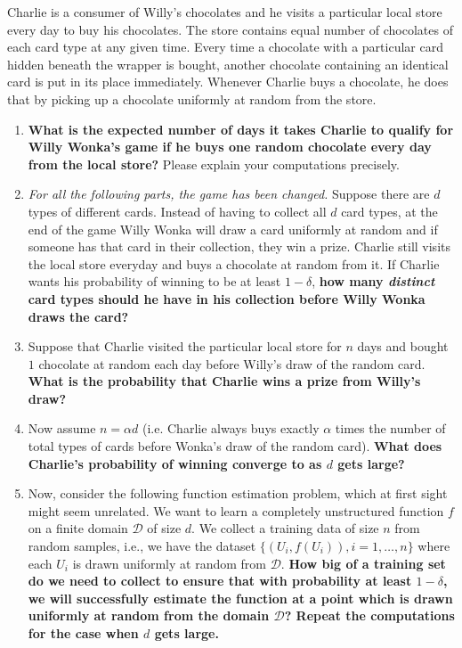 \documentclass{article}\usepackage[utf8]{inputenc}\usepackage[margin=0.4cm,top=0.4cm,bottom=0.4cm]{geometry}\usepackage[usenames,dvipsnames,svgnames,table]{xcolor}
\begin{document}
\noindent Charlie is a consumer of Willy's chocolates and he visits a particular local store every day to buy his chocolates. The store contains equal number of chocolates of each card type at any given time. Every time a chocolate with a particular card hidden beneath the wrapper is bought, another chocolate containing an identical card is put in its place immediately. Whenever Charlie buys a chocolate, he does that by picking up a chocolate uniformly at random from the store.
\begin{enumerate}
\item \textbf{What is the expected number of days it takes Charlie to qualify for Willy Wonka's game if he buys one random chocolate every day from the local store?} Please explain your computations precisely.
\BeginSolution

\EndSolution
\item \textit{For all the following parts, the game has been changed.} Suppose there are $d$ types of different cards. Instead of having to collect all $d$ card types, at the end of the game Willy Wonka will draw a card uniformly at random and if someone has that card in their collection, they win a prize. Charlie still visits the local store everyday and buys a chocolate at random from it. If Charlie wants his probability of winning to be at least $1-\delta$, \textbf{how many \textit{distinct} card types should he have in his collection before Willy Wonka draws the card?}
\BeginSolution

\EndSolution
\item Suppose that Charlie visited the particular local store for $n$ days and bought $1$ chocolate at random each day before Willy's draw of the random card. \textbf{What is the probability that Charlie wins a prize from Willy's draw?}
\BeginSolution

\EndSolution
\item Now assume $n = \alpha d$ (i.e. Charlie always buys exactly $\alpha$ times the number of total types of cards before Wonka's draw of the random card). \textbf{What does Charlie's probability of winning converge to as $d$ gets large?}
\BeginSolution

\EndSolution
\item Now, consider the following function estimation problem, which  at first sight might seem unrelated. We want to learn a completely unstructured function $f$ on a finite domain $\mathcal{D}$ of size $d$. We collect a training data of size $n$ from random samples, i.e., we have the dataset $\{(U_i, f(U_i)), i=1, \ldots, n \}$ where each $U_i$ is drawn uniformly at random from $\mathcal{D}$. \textbf{How big of a training set do we need to collect to ensure that with probability at least $1-\delta$, we will successfully estimate the function at a point which is drawn uniformly at random from the domain $\mathcal{D}$? Repeat the computations for the case when $d$ gets large.}
\BeginSolution

\EndSolution
\end{enumerate}
\clearpage
\end{document}
